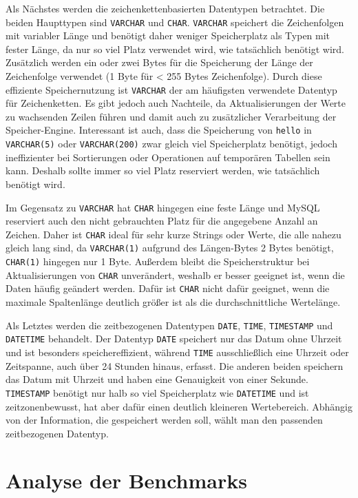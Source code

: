 Als Nächstes werden die zeichenkettenbasierten Datentypen betrachtet.
Die beiden Haupttypen sind \texttt{VARCHAR} und \texttt{CHAR}.
\texttt{VARCHAR} speichert die Zeichenfolgen mit variabler Länge und benötigt daher weniger Speicherplatz als Typen mit fester Länge, da nur so viel Platz verwendet wird, wie tatsächlich benötigt wird.
Zusätzlich werden ein oder zwei Bytes für die Speicherung der Länge der Zeichenfolge verwendet (1 Byte für < 255 Bytes Zeichenfolge).
Durch diese effiziente Speichernutzung ist \texttt{VARCHAR} der am häufigsten verwendete Datentyp für Zeichenketten.
Es gibt jedoch auch Nachteile, da Aktualisierungen der Werte zu wachsenden Zeilen führen und damit auch zu zusätzlicher Verarbeitung der Speicher-Engine.
Interessant ist auch, dass die Speicherung von \texttt{hello} in \texttt{VARCHAR(5)} oder \texttt{VARCHAR(200)} zwar gleich viel Speicherplatz benötigt, jedoch ineffizienter bei Sortierungen oder Operationen auf temporären Tabellen sein kann.
Deshalb sollte immer so viel Platz reserviert werden, wie tatsächlich benötigt wird.

Im Gegensatz zu \texttt{VARCHAR} hat \texttt{CHAR} hingegen eine feste Länge und MySQL reserviert auch den nicht gebrauchten Platz für die angegebene Anzahl an Zeichen.
Daher ist \texttt{CHAR} ideal für sehr kurze Strings oder Werte, die alle nahezu gleich lang sind, da \texttt{VARCHAR(1)} aufgrund des Längen-Bytes 2 Bytes benötigt, \texttt{CHAR(1)} hingegen nur 1 Byte.
Außerdem bleibt die Speicherstruktur bei Aktualisierungen von \texttt{CHAR} unverändert, weshalb er besser geeignet ist, wenn die Daten häufig geändert werden.
Dafür ist \texttt{CHAR} nicht dafür geeignet, wenn die maximale Spaltenlänge deutlich größer ist als die durchschnittliche Wertelänge.

Als Letztes werden die zeitbezogenen Datentypen \texttt{DATE}, \texttt{TIME}, \texttt{TIMESTAMP} und \texttt{DATETIME} behandelt.
Der Datentyp \texttt{DATE} speichert nur das Datum ohne Uhrzeit und ist besonders speichereffizient, während \texttt{TIME} ausschließlich eine Uhrzeit oder Zeitspanne, auch über 24 Stunden hinaus, erfasst.
Die anderen beiden speichern das Datum mit Uhrzeit und haben eine Genauigkeit von einer Sekunde.
\texttt{TIMESTAMP} benötigt nur halb so viel Speicherplatz wie \texttt{DATETIME} und ist zeitzonenbewusst, hat aber dafür einen deutlich kleineren Wertebereich.
Abhängig von der Information, die gespeichert werden soll, wählt man den passenden zeitbezogenen Datentyp.

\section{Analyse der Benchmarks}\label{sec:data-types-analyse-der-benchmarks}


